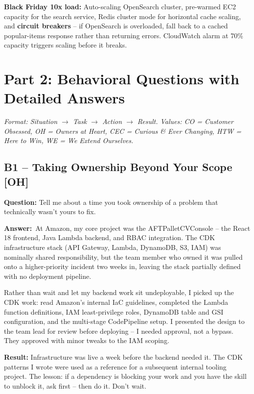 \documentclass[letterpaper,10pt]{article}
\newlength{\boxwidth}
\newcommand{\bquestionbox}[1]{%
  \vspace{6pt}%
  \noindent\colorbox{bqbg}{%
    \begin{minipage}{\boxwidth}%
      \vspace{3pt}\textbf{\textcolor{orange!70!black}{Question:}} #1\vspace{3pt}%
    \end{minipage}%
  }\vspace{2pt}%
}
\newcommand{\answerlabel}{\noindent\textbf{\textcolor{answerblue}{Answer:}}~}
\begin{document}
\textbf{Black Friday 10x load:} Auto-scaling OpenSearch cluster, pre-warmed EC2 capacity for the search service, Redis cluster mode for horizontal cache scaling, and \textbf{circuit breakers} -- if OpenSearch is overloaded, fall back to a cached popular-items response rather than returning errors. CloudWatch alarm at 70\% capacity triggers scaling before it breaks.

\newpage

\section{Part 2: Behavioral Questions with Detailed Answers}

\noindent\textit{Format: Situation $\rightarrow$ Task $\rightarrow$ Action $\rightarrow$ Result. Values: CO = Customer Obsessed, OH = Owners at Heart, CEC = Curious \& Ever Changing, HTW = Here to Win, WE = We Extend Ourselves.}
\vspace{4pt}

\subsection*{B1 -- Taking Ownership Beyond Your Scope \textmd{[OH]}}

\bquestionbox{Tell me about a time you took ownership of a problem that technically wasn't yours to fix.}

\answerlabel At Amazon, my core project was the AFTPalletCVConsole -- the React 18 frontend, Java Lambda backend, and RBAC integration. The CDK infrastructure stack (API Gateway, Lambda, DynamoDB, S3, IAM) was nominally shared responsibility, but the team member who owned it was pulled onto a higher-priority incident two weeks in, leaving the stack partially defined with no deployment pipeline.

Rather than wait and let my backend work sit undeployable, I picked up the CDK work: read Amazon's internal IaC guidelines, completed the Lambda function definitions, IAM least-privilege roles, DynamoDB table and GSI configuration, and the multi-stage CodePipeline setup. I presented the design to the team lead for review before deploying -- I needed approval, not a bypass. They approved with minor tweaks to the IAM scoping.

\textbf{Result:} Infrastructure was live a week before the backend needed it. The CDK patterns I wrote were used as a reference for a subsequent internal tooling project. The lesson: if a dependency is blocking your work and you have the skill to unblock it, ask first -- then do it. Don't wait.
\end{document}
